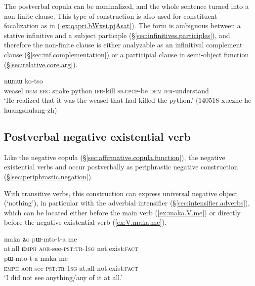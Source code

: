 The postverbal copula can be nominalized, and the whole sentence turned into a non-finite clause. This type of construction is also used for constituent focalization  as in (\ref{ex:qapri.bWxsi.pjAsat}). The form  is ambiguous between a stative infinitive and a subject participle (§\ref{sec:infinitives.participles}), and therefore the non-finite clause is either analyzable as an infinitival complement clause (§\ref{sec:inf.complementation}) or a participial clause in semi-object function (§\ref{sec:relative.core.arg}).


\begin{exe}
\ex \label{ex:qapri.bWxsi.pjAsat}
 nɯnɯ ko-tso \\
weasel \textsc{dem} \textsc{erg} snake python \textsc{ifr}-kill \textsc{sbj}:\textsc{pcp}-be \textsc{dem} \textsc{ifr}-understand \\
\glt `He realized that it was the weasel that had killed the python.' (140518 xuezhe he huangshulang-zh)
\end{exe}

\subsection{Postverbal negative existential verb} \label{sec:negation.existential}
Like the negative copula  (§\ref{sec:affirmative.copula.function}), the negative existential verbs  and   occur postverbally as periphrastic negative construction (§\ref{sec:periphrastic.negation}).

With transitive verbs, this construction can express universal negative object (`nothing'), in particular with the adverbial intensifier  (§\ref{sec:intensifier.adverbs}), which can be located either before the main verb (\ref{ex:maka.V.me}) or directly before the negative existential verb  (\ref{ex:V.maka.me}). 

\begin{exe}
\ex 
\begin{xlist}
\ex \label{ex:maka.V.me}
\gll maka ʑo pɯ-mto-t-a me \\
at.all \textsc{emph} \textsc{aor}-see-\textsc{pst}:\textsc{tr}-\textsc{1sg} not.exist:\textsc{fact} \\
\ex \label{ex:V.maka.me}
\gll pɯ-mto-t-a maka me \\
\textsc{emph} \textsc{aor}-see-\textsc{pst}:\textsc{tr}-\textsc{1sg} at.all  not.exist:\textsc{fact} \\
\glt `I did not see anything/any of it at all.' 
\end{xlist}
\end{exe}

